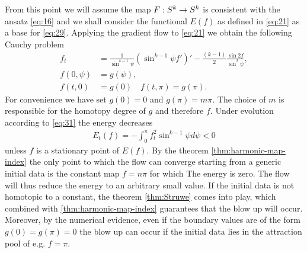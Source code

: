 From this point we will assume the map $F:S^k\rightarrow S^k$ is consistent
with the ansatz \eqref{eq:16} and we shall consider the functional
$E(f)$ as defined in \eqref{eq:21} as a base for
\eqref{eq:29}. Applying the gradient flow to \eqref{eq:21} we obtain
the following Cauchy problem
\begin{equation}
  \label{eq:en_flow}
  \begin{split}
    f_t&=\frac{1}{\sin^{k-1}\psi}\left(\sin^{k-1}\psi
      f'\right)'-\frac{(k-1)}{2}\frac{\sin2f}{\sin^2\psi},\\
    f(0,\psi)&=g(\psi),\\
    f(t,0)&=g(0)\quad f(t,\pi)=g(\pi).
  \end{split}
\end{equation}
For convenience we have set $g(0)=0$ and $g(\pi)=m\pi$. The choice of
$m$ is responsible for the homotopy degree of $g$ and therefore
$f$. Under evolution according to \eqref{eq:31} the energy decreases
\begin{align}
  \label{eq:32}
  E_t(f)=-\int_0^{\pi}f_t^2\sin^{k-1}\psi d\psi<0
\end{align}
unless $f$ is a stationary point of $E(f)$. By the theorem
\ref{thm:harmonic-map-index} the only point to which the flow can
converge starting from a generic initial data is the constant map
$f=n\pi$ for which The energy is zero. The flow will thus reduce the
energy to an arbitrary small value. If the initial data is not
homotopic to a constant, the theorem \ref{thm:Struwe} comes into play,
which combined with \ref{thm:harmonic-map-index} guarantees that the
blow up will occur. Moreover, by the numerical evidence, even if the
boundary values are of the form $g(0)=g(\pi)=0$ the blow up can occur
if the initial data lies in the attraction pool of e.g. $f=\pi$.\\

